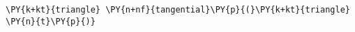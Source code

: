\begin{Verbatim}[commandchars=\\\{\}]
    \PY{k+kt}{triangle} \PY{n+nf}{tangential}\PY{p}{(}\PY{k+kt}{triangle} \PY{n}{t}\PY{p}{)}
\end{Verbatim}
